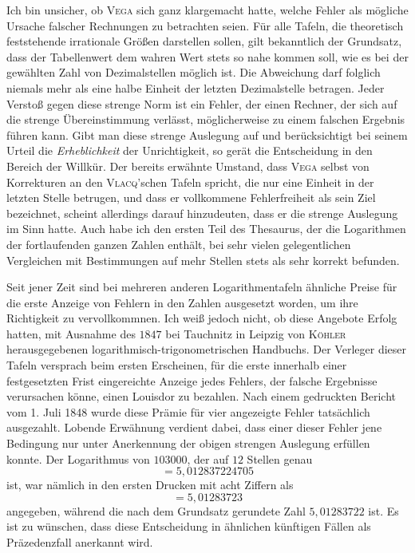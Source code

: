 Ich bin unsicher, ob \textsc{Vega} sich ganz klargemacht hatte, welche Fehler als mögliche Ursache falscher Rechnungen zu betrachten seien. Für alle Tafeln, die theoretisch feststehende irrationale Größen darstellen sollen, gilt bekanntlich der Grundsatz, dass der Tabellenwert dem wahren Wert stets so nahe kommen soll, wie es bei der gewählten Zahl von Dezimalstellen möglich ist. Die Abweichung darf folglich niemals mehr als eine halbe Einheit der letzten Dezimalstelle betragen. Jeder Verstoß gegen diese strenge Norm ist ein Fehler, der einen Rechner, der sich auf die strenge Übereinstimmung verlässt, möglicherweise zu einem falschen Ergebnis führen kann. Gibt man diese strenge Auslegung auf und berücksichtigt bei seinem Urteil die \emph{Erheblichkeit} der Unrichtigkeit, so gerät die Entscheidung in den Bereich der Willkür. Der bereits erwähnte Umstand, dass \textsc{Vega} selbst von Korrekturen an den \textsc{Vlacq}'schen Tafeln spricht, die nur eine Einheit in der letzten Stelle betrugen, und dass er vollkommene Fehlerfreiheit als sein Ziel bezeichnet, scheint allerdings darauf hinzudeuten, dass er die strenge Auslegung im Sinn hatte. Auch habe ich den ersten Teil des Thesaurus, der die Logarithmen der fortlaufenden ganzen Zahlen enthält, bei sehr vielen gelegentlichen Vergleichen mit Bestimmungen auf mehr Stellen stets als sehr korrekt befunden.

Seit jener Zeit sind bei mehreren anderen Logarithmentafeln ähnliche Preise für die erste Anzeige von Fehlern in den Zahlen ausgesetzt worden, um ihre Richtigkeit zu vervollkommnen. Ich weiß jedoch nicht, ob diese Angebote Erfolg hatten, mit Ausnahme des $1847$ bei Tauchnitz in Leipzig von \textsc{Köhler} herausgegebenen logarithmisch-trigonometrischen Handbuchs. Der Verleger dieser Tafeln versprach beim ersten Erscheinen, für die erste  innerhalb einer festgesetzten Frist eingereichte Anzeige jedes Fehlers, der falsche Ergebnisse verursachen könne, einen Louisdor zu bezahlen. Nach einem gedruckten Bericht vom 1. Juli 1848 wurde diese Prämie für vier angezeigte Fehler tatsächlich ausgezahlt. Lobende Erwähnung verdient dabei, dass einer dieser Fehler jene Bedingung nur unter Anerkennung der obigen strengen Auslegung erfüllen konnte. Der Logarithmus von \(103000\), der auf \(12\) Stellen genau
\[
=5{,}012837224705
\]
ist, war nämlich in den ersten Drucken mit acht Ziffern als
\[
=5{,}01283723
\]
angegeben, während die nach dem Grundsatz gerundete Zahl \(5{,}01283722\) ist. Es ist zu wünschen, dass diese Entscheidung in ähnlichen künftigen Fällen als Präzedenzfall anerkannt wird.

